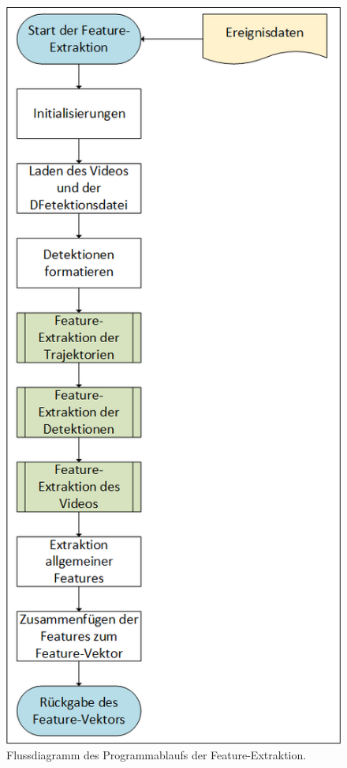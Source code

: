 \begin{figure}[p]
    \centering
    \includegraphics[height=0.9\textheight]{img/Grafiken/Flussdiagramm Feature-Extraktion sammeln.png}
    \caption{Flussdiagramm des Programmablaufs der Feature-Extraktion.}
    \label{fig:FlussDia FeatExtraktion}
\end{figure}

